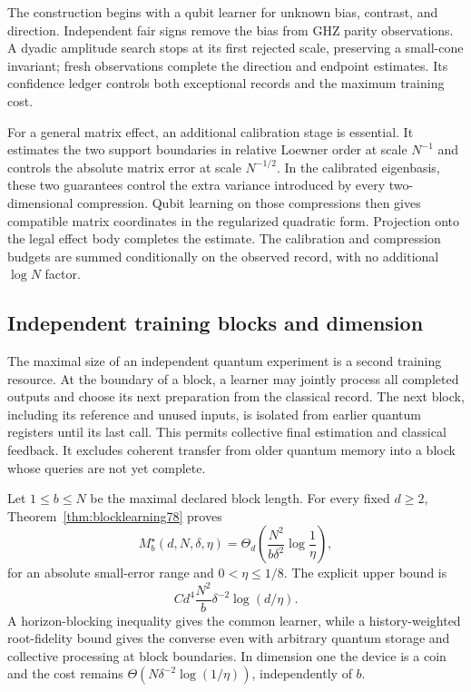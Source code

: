 The construction begins with a qubit learner for unknown bias,
contrast, and direction. Independent fair signs remove the bias from
GHZ parity observations. A dyadic amplitude search stops at its first
rejected scale, preserving a small-cone invariant; fresh observations
complete the direction and endpoint estimates. Its confidence ledger
controls both exceptional records and the maximum training cost.

For a general matrix effect, an additional calibration stage is
essential. It estimates the two support boundaries in relative
Loewner order at scale $N^{-1}$ and controls the absolute matrix error
at scale $N^{-1/2}$. In the calibrated eigenbasis, these two guarantees
control the extra variance introduced by every two-dimensional
compression. Qubit learning on those compressions then gives
compatible matrix coordinates in the regularized quadratic form.
Projection onto the legal effect body completes the estimate. The
calibration and compression budgets are summed conditionally on the
observed record, with no additional $\log N$ factor.

\subsection{Independent training blocks and dimension}
The maximal size of an independent quantum experiment is a second
training resource.  At the boundary of a block, a learner may jointly
process all completed outputs and choose its next preparation from the
classical record.  The next block, including its reference and unused
inputs, is isolated from earlier quantum registers until its last call.
This permits collective final estimation and classical feedback.
It excludes coherent transfer from older quantum memory into a block
whose queries are not yet complete.

Let $1\le b\le N$ be the maximal declared block length.
For every fixed $d\ge2$, Theorem~\ref{thm:blocklearning78} proves
\begin{equation}\label{eq:introblock78}
 M_b^\star(d,N,\delta,\eta)
 =\Theta_d\!\left(\frac{N^2}{b\delta^2}\log\frac1\eta\right),
\end{equation}
for an absolute small-error range and $0<\eta\le1/8$.
The explicit upper bound is
\[
 Cd^4\frac{N^2}{b}\delta^{-2}\log(d/\eta).
\]
A horizon-blocking inequality gives the common learner, while a
history-weighted root-fidelity bound gives the converse even with
arbitrary quantum storage and collective processing at block boundaries.
In dimension one the device is a coin and the cost remains
$\Theta(N\delta^{-2}\log(1/\eta))$, independently of $b$.

